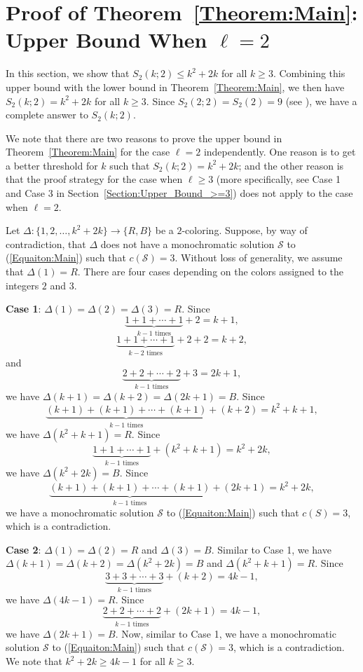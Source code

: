 \documentclass[11pt]{article}
\theoremstyle{definition}
\begin{document}
\section{Proof of Theorem~\ref{Theorem:Main}: Upper Bound When $\ell=2$}\label{Section:Upper_Bound_2}
In this section, we show that $S_2(k;2)\leq k^2+2k$ for all $k\geq3$. Combining this upper bound with the lower bound in Theorem~\ref{Theorem:Main}, we then have $S_2(k;2)=k^2+2k$ for all $k\geq3$. Since $S_2(2;2)=S_2(2)=9$ (see \cite[p.~349]{ABRS2023}), we have a complete answer to $S_2(k;2)$.

We note that there are two reasons to prove the upper bound in Theorem~\ref{Theorem:Main} for the case $\ell=2$ independently. One reason is to get a better threshold for $k$ such that $S_2(k;2)=k^2+2k$; and the other reason is that the proof strategy for the case when $\ell\geq3$ (more specifically, see Case 1 and Case 3 in Section~\ref{Section:Upper_Bound_>=3}) does not apply to the case when $\ell=2$.

Let $\Delta:\{1,2,\ldots,k^2+2k\}\to\{R,B\}$ be a $2$-coloring. Suppose, by way of contradiction, that $\Delta$ does not have a monochromatic solution $\mathcal{S}$ to (\ref{Equaiton:Main}) such that $c(\mathcal{S})=3$. Without loss of generality, we assume that $\Delta(1)=R$. There are four cases depending on the colors assigned to the integers $2$ and $3$.

\textbf{Case 1}: $\Delta(1)=\Delta(2)=\Delta(3)=R$. Since
\[
\underbrace{1+1+\cdots+1}_{k-1\text{ times}}+2=k+1,
\]
\[
\underbrace{1+1+\cdots+1}_{k-2\text{ times}}+2+2=k+2,
\]
and
\[
\underbrace{2+2+\cdots+2}_{k-1\text{ times}}+3=2k+1,
\]
we have $\Delta(k+1)=\Delta(k+2)=\Delta(2k+1)=B$. Since
\[
\underbrace{(k+1)+(k+1)+\cdots+(k+1)}_{k-1\text{ times}}+(k+2)=k^2+k+1,
\]
we have $\Delta(k^2+k+1)=R$. Since
\[
\underbrace{1+1+\cdots+1}_{k-1\text{ times}}+(k^2+k+1)=k^2+2k,
\]
we have $\Delta(k^2+2k)=B$. Since
\[
\underbrace{(k+1)+(k+1)+\cdots+(k+1)}_{k-1\text{ times}}+(2k+1)=k^2+2k,
\]
we have a monochromatic solution $\mathcal{S}$ to (\ref{Equaiton:Main}) such that $c(S)=3$, which is a contradiction.

\textbf{Case 2}: $\Delta(1)=\Delta(2)=R$ and $\Delta(3)=B$. Similar to Case 1, we have $\Delta(k+1)=\Delta(k+2)=\Delta(k^2+2k)=B$ and $\Delta(k^2+k+1)=R$. Since
\[
\underbrace{3+3+\cdots+3}_{k-1\text{ times}}+(k+2)=4k-1,
\]
we have $\Delta(4k-1)=R$. Since 
\[
\underbrace{2+2+\cdots+2}_{k-1\text{ times}}+(2k+1)=4k-1,
\]
we have $\Delta(2k+1)=B$. Now, similar to Case 1, we have a monochromatic solution $\mathcal{S}$ to (\ref{Equaiton:Main}) such that $c(\mathcal{S})=3$, which is a contradiction. We note that $k^2+2k\geq4k-1$ for all $k\geq3$.
\end{document}
